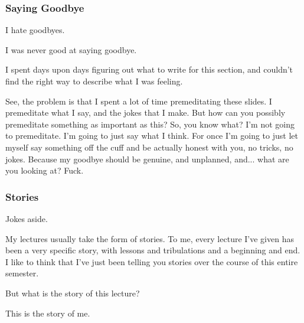 \documentclass[aspectratio=169, handout]{beamer}
\begin{document}
\begin{frame}[fragile]
  \frametitle{Saying Goodbye}

  I hate goodbyes.

  \pause
  \vspace{\fill}

  I was never good at saying goodbye.

  \pause
  \vspace{\fill}

  I spent days upon days figuring out what to write for this section, and
  couldn't find the right way to describe what I was feeling.

  \pause
  \vspace{\fill}

  See, the problem is that I spent a lot of time premeditating these slides. I
  premeditate what I say, and the jokes that I make. But how can you possibly
  premeditate something as important as this? So, you know what? I'm
  not going to premeditate. I'm going to just say what I think. For once I'm
  going to just let myself say something off the cuff and be actually honest with
  you, no tricks, no jokes. Because my goodbye should be genuine, and unplanned,
  and... what are you looking at? Fuck.
\end{frame}

\begin{frame}[fragile]
  \frametitle{Stories}

  Jokes aside.

  \pause
  \vspace{\fill}

  My lectures usually take the form of stories. To me, every lecture I've given
  has been a very specific story, with lessons and tribulations and a beginning
  and end. I like to think that I've just been telling you stories over the
  course of this entire semester.

  \pause
  \vspace{\fill}

  But what is the story of this lecture?

  \pause
  \vspace{\fill}

  This is the story of me.

  \begin{comment}
    Jokes aside, I did manage to figure out what it is that was giving me
    so much trouble with this goodbye.

    But what is the story of this lecture? What's the story that I can say now,
    now that I've finished with what I wanted to say about functional programming?
    Because I also have a sense of closure, and this story is not done.

    I realized that this story ends with me.
  \end{comment}
\end{frame}
\end{document}
